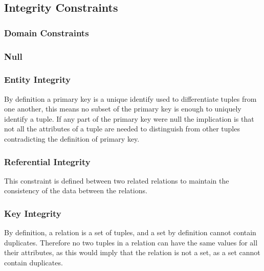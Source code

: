 \documentclass[12pt letter]{report}
\begin{document}
\subsection{Integrity Constraints}

\subsubsection{Domain Constraints}

\subsubsection{Null}

\subsubsection{Entity Integrity}


By definition a primary key is a unique identify used to differentiate tuples from one another, this means no subset of
the primary key is enough to uniquely identify a tuple. If any part of the primary key were null the implication is that
not all the attributes of a tuple are needed to distinguish from other tuples contradicting the definition of primary
key.

\subsubsection{Referential Integrity}


This constraint is defined between two related relations to maintain the consistency of the data between the relations.

\subsubsection{Key Integrity}

By definition, a relation is a set of tuples, and a set by definition cannot contain duplicates. Therefore no two tuples
in a relation can have the same values for all their attributes, as this would imply that the relation is not a set, as
a set cannot contain duplicates.
\end{document}
